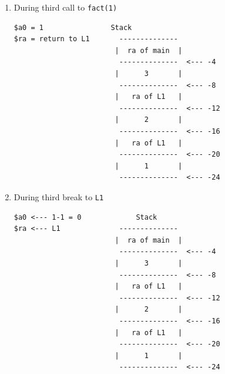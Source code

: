 \documentclass[10pt]{article}
\begin{document}
\begin{enumerate}
\item During third call to \texttt{fact(1)}
\begin{lstlisting}[style=CStyle, xleftmargin=5.0ex, aboveskip=1em, belowskip=1em, escapeinside=..]
$a0 = 1                Stack
$ra = return to L1       --------------
                        |  ra of main  |
                         --------------  <--- -4
                        |      3       |
                         --------------  <--- -8
                        |   ra of L1   |
                         --------------  <--- -12
                        |      2       |
                         --------------  <--- -16
                        |   ra of L1   |
                         --------------  <--- -20
                        |      1       |
                         --------------  <--- -24
\end{lstlisting}

\item During third break to \texttt{L1}
\begin{lstlisting}[style=CStyle, xleftmargin=5.0ex, aboveskip=1em, belowskip=1em, escapeinside=..]
$a0 <--- 1-1 = 0             Stack
$ra <--- L1              --------------
                        |  ra of main  |
                         --------------  <--- -4
                        |      3       |
                         --------------  <--- -8
                        |   ra of L1   |
                         --------------  <--- -12
                        |      2       |
                         --------------  <--- -16
                        |   ra of L1   |
                         --------------  <--- -20
                        |      1       |
                         --------------  <--- -24
\end{lstlisting}


\end{enumerate}
\end{document}
